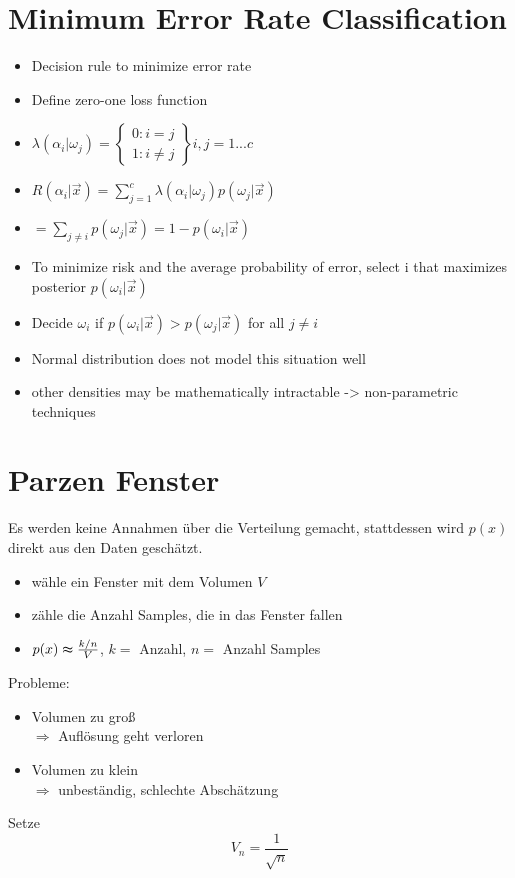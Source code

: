 \section{Minimum Error Rate Classification}
\begin{itemize}
	\item Decision rule to minimize error rate
	\item Define zero-one loss function
	\item $\lambda(\alpha_i|\omega_j)=\left\{
	\begin{array}{c}
		0 : i=j \\
		1 : i\neq j
	\end{array}\right\} i,j=1...c
	$
	\item $R(\alpha_i|\vec{x})=\sum^{c}_{j=1}\lambda(\alpha_i|\omega_j)p(\omega_j|\vec{x})$
	\item $=\sum_{j\neq i}p(\omega_j|\vec{x})=1-p(\omega_i|\vec{x})$
	\item To minimize risk and the average probability of error, select i that maximizes posterior $p(\omega_i|\vec{x})$
	\item Decide $\omega_i$ if $p(\omega_i|\vec{x})>p(\omega_j|\vec{x})$ for all $j\neq i$
	\item Normal distribution does not model this situation well
	\item other densities may be mathematically intractable -> non-parametric techniques
\end{itemize}

\section{Parzen Fenster}

Es werden keine Annahmen über die Verteilung gemacht, stattdessen wird $p(x)$ direkt aus den Daten geschätzt.
\begin{itemize}
\item wähle ein Fenster mit dem Volumen $V$
\item zähle die Anzahl Samples, die in das Fenster fallen
\item $p(x) \thickapprox \frac{k/n}{V}$, $k = $ Anzahl, $n = $ Anzahl Samples
\end{itemize}
Probleme:
\begin{itemize}
\item Volumen zu groß \\ $\Rightarrow$ Auflösung geht verloren
\item Volumen zu klein \\ $\Rightarrow$ unbeständig, schlechte Abschätzung
\end{itemize}
Setze $$V_n = \frac{1}{\sqrt{n}}$$

